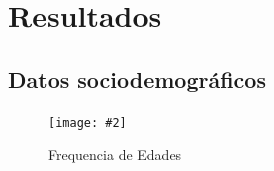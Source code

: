 \documentclass[stu, 12pt]{apa7}
\newcommand{\includegraphicsmax}[2][]{%
	\texttt{[image: \#2]}%
}
\begin{document}











	\section{Resultados}\label{resultados}

	\subsection{Datos sociodemográficos}

	\begin{figure}[H]
		\centering
		\includegraphicsmax{freq.age.pdf}
		\caption{Frequencia de Edades}
		\label{fig:Figure1}
	\end{figure}
\end{document}
